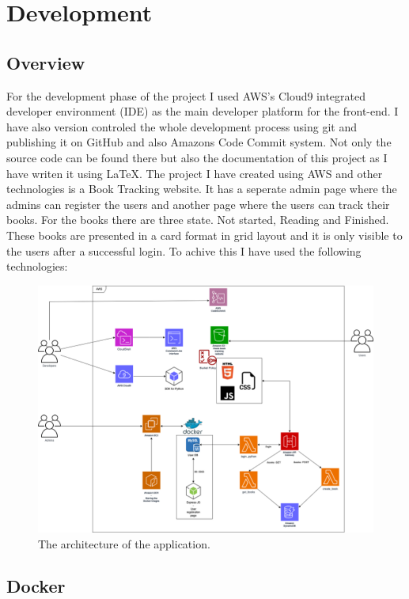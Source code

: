 \documentclass[11pt,a4paper,oneside]{report}
\begin{document}
\chapter{Development}

\section{Overview}
For the development phase of the project I used AWS's Cloud9 integrated developer environment (IDE) as the main developer platform for the front-end.
I have also version controled the whole development process using git and publishing it on GitHub and also Amazons Code Commit system. Not only the source code can be found there but also the documentation of this project as I have writen it using \LaTeX{}.
The project I have created using AWS and other technologies is a Book Tracking website. It has a seperate admin page where the admins can register the users and another page where the users can track their books.
For the books there are three state. Not started, Reading and Finished. These books are presented in a card format in grid layout and it is only visible to the users after a successful login.
To achive this I have used the following technologies:


\begin{figure}[!ht]
  \centering
  \includegraphics[scale=0.23]{aws.drawio.png}
  \caption{The architecture of the application.}
  \label{fig:TexnicCenter}
\end{figure}

\section{Docker}
\end{document}
